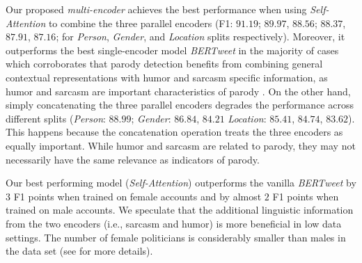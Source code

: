 \documentclass[11pt]{article}
\begin{document}
Our proposed \emph{multi-encoder} achieves the best performance when using \textit{Self-Attention} to combine the three parallel encoders (F1: $91.19$; $89.97$, $88.56$; $88.37$, $87.91$, $87.16$; for \emph{Person}, \emph{Gender}, and \emph{Location} splits respectively). Moreover, it outperforms the best single-encoder model \textit{BERTweet} in the majority of cases which corroborates that parody detection benefits from combining general contextual representations with humor and sarcasm specific information, as humor and sarcasm are important characteristics of parody \citep{haiman1998talk,Parody_Humor}. On the other hand, simply concatenating the three parallel encoders degrades the performance across different splits (\emph{Person}: $88.99$; \emph{Gender}: $86.84$, $84.21$ \emph{Location}: $85.41$, $84.74$, $83.62$). This happens because the concatenation operation treats the three encoders as equally important. While humor and sarcasm are related to parody, they may not necessarily have the same relevance as indicators of parody. %

Our best performing model (\textit{Self-Attention}) outperforms the vanilla \textit{BERTweet} by $3$ F1 points when trained on female accounts and by almost $2$ F1 points when trained on male accounts. We speculate that the additional linguistic information from the two encoders (i.e., sarcasm and humor) is more beneficial in low data settings. The number of female politicians is considerably smaller than males in the data set (see \citet{maronikolakis-etal-2020-analyzing} for more details). 


\end{document}
